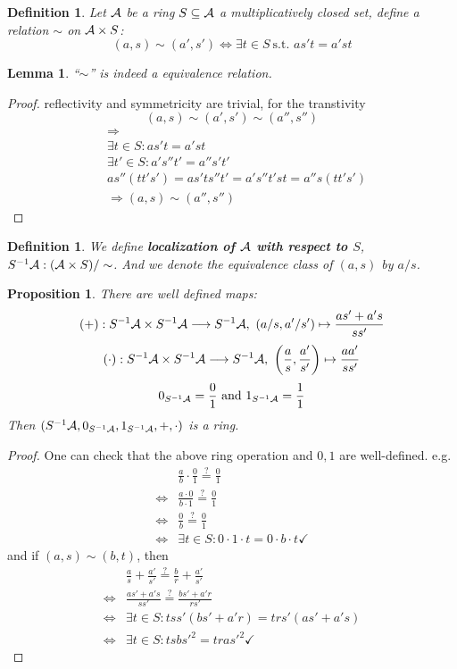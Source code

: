 \documentclass[11pt]{article}
\newtheorem{prop}[thm]{Proposition}
\newtheorem{lemma}[thm]{Lemma}
\newtheorem{dfn}[thm]{Definition}
\newcommand{\cala}{{\cal A}}
\newcommand{\Lrta}{\Longrightarrow}
\newcommand{\lrta}{\longrightarrow}
\newcommand{\Llrta}{\Longleftrightarrow}
\begin{document}
\begin{dfn}
Let $\cala$ be a ring $S\subseteq \cala$ a multiplicatively closed set, define a relation $\sim $ on $\cala\times S$:
$$
(a,s)\sim(a',s')\Longleftrightarrow\exists t\in S \ \text{s.t. } as' t= a' st
$$
\end{dfn}

\begin{lemma}
``$\sim$'' is indeed a equivalence relation.
\end{lemma}
\begin{proof}
reflectivity and symmetricity are trivial, for the transtivity
$$
(a,s)\sim(a',s')\sim (a'',s'')
$$
$$
\begin{aligned}
&\Lrta\\
&\exists t\in S: as't=a's t\\
& \exists t'\in S: a's'' t'=a''s't'\\
&as''(tt's')=as'ts''t'=a's''t's t=a''s (t t's')\\
& \Lrta (a,s)\sim(a'',s'')
\end{aligned}
$$
\end{proof}
\begin{dfn}
We define \textbf{localization of $\cala$ with respect to $S$}, 
$S^{-1}\cala:(\cala\times S)/\sim$.  And we denote the equivalence class of $(a,s)$ by $a/s$.
\end{dfn}
\begin{prop}
There are well defined maps:
$$
(+):S^{-1}\cala\times S^{-1}\cala\lrta S^{-1}\cala,\ (a/s,a'/s')\mapsto \frac{as'+a's}{ss'}
$$
$$
(\cdot):S^{-1}\cala\times S^{-1}\cala\lrta S^{-1}\cala,\ \left(\frac{a}{s},\frac{a'}{s'}\right)\mapsto \frac{aa'}{ss'}
$$
$$
0_{S^{-1}\cala}=\frac{0}{1}\text{ and } 1_{S^{-1}\cala}=\frac{1}{1}
$$
Then $(S^{-1}\cala,0_{S^{-1}\cala},1_{S^{-1}\cala},+,\cdot)$ is a ring.
\end{prop}
\begin{proof}
One can check that the above ring operation and $0,1$ are well-defined. e.g.\\
$$
\begin{aligned}
&\frac{a}{b}\cdot\frac{0}{1}\overset{?}{=}\frac{0}{1}\\
\Llrta & \frac{a\cdot 0}{b\cdot 1}\overset{?}{=}\frac{0}{1}\\
\Llrta & \frac{0}{b}\overset{?}{=}\frac{0}{1}\\
\Llrta &\exists t\in S: 0\cdot 1\cdot t=0\cdot b\cdot t\checkmark
\end{aligned}
$$
and if $(a,s)\sim (b,t)$, then
$$
\begin{aligned}
&\frac{a}{s}+\frac{a'}{s'}\overset{?}{=}\frac{b}{r}+\frac{a'}{s'}\\
\Llrta &\frac{as'+a's}{ss'}\overset{?}{=}\frac{bs'+a'r}{rs'}\\
\Llrta & \exists t\in S: tss'(bs'+a'r)=trs'(as'+a's)\\
\Llrta & \exists t\in S: tsbs'^2=tras'^2\checkmark
\end{aligned}
$$

\end{proof}
\end{document}

